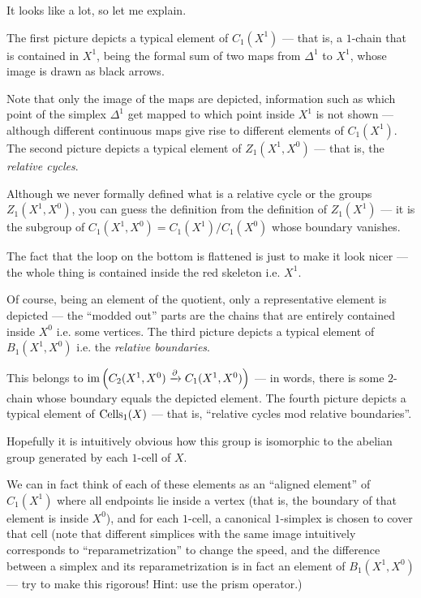 It looks like a lot, so let me explain.
\begin{itemize}
	\ii The first picture depicts a typical element of $C_1(X^1)$ --- that is, a $1$-chain that is
	contained in $X^1$, being the formal sum of two
	maps from $\Delta^1$ to $X^1$, whose image is drawn as black arrows.

	Note that only the image of the maps are depicted, information such as which point of the
	simplex $\Delta^1$ get mapped to which point inside $X^1$ is not shown --- although different
	continuous maps give rise to different elements of $C_1(X^1)$.
	\ii The second picture depicts a typical element of $Z_1(X^1, X^0)$ --- that is, the
	\emph{relative cycles}.

	Although we never formally defined what is a relative cycle or the groups $Z_1(X^1, X^0)$, you
	can guess the definition from the definition of $Z_1(X^1)$ --- it is the subgroup of
	$C_1(X^1, X^0) = C_1(X^1)/C_1(X^0)$ whose boundary vanishes.

	The fact that the loop on the bottom is flattened is just to make it look nicer --- the whole
	thing is contained inside the red skeleton i.e. $X^1$.

	Of course, being an element of the quotient, only a representative element is depicted ---
	the ``modded out'' parts are the chains that are entirely contained inside $X^0$ i.e. some
	vertices.
	\ii The third picture depicts a typical element of $B_1(X^1, X^0)$ i.e. the \emph{relative
	boundaries}.

	This belongs to $\operatorname{im} \left( C_2(X^1, X^0) \xrightarrow{\partial} C_1(X^1, X^0) \right)$ --- in words,
	there is some $2$-chain whose boundary equals the depicted element.
	\ii The fourth picture depicts a typical element of $\operatorname{Cells}_1(X)$ --- that is, ``relative cycles
	mod relative boundaries''.

	Hopefully it is intuitively obvious how this group is isomorphic to the abelian group generated
	by each $1$-cell of $X$.

	We can in fact think of each of these elements as an ``aligned element'' of $C_1(X^1)$
	where all endpoints lie inside a vertex (that is, the boundary of that element is inside $X^0$),
	and for each $1$-cell, a canonical $1$-simplex is chosen to cover that cell (note that different
	simplices with the same image intuitively corresponds to ``reparametrization'' to change the
	speed, and the difference between a simplex and its reparametrization is in fact
	an element of $B_1(X^1, X^0)$ --- try to make this rigorous! Hint: use the prism operator.)


\end{itemize}
